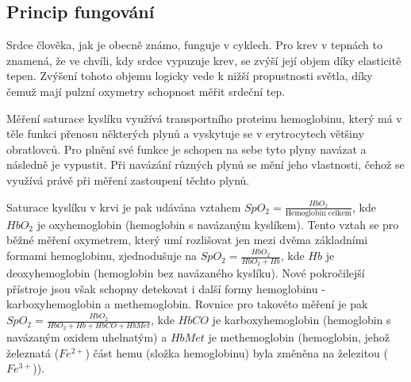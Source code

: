 \subsection {Princip fungování}
Srdce člověka, jak je obecně známo, funguje v cyklech. Pro krev v tepnách to znamená, že ve chvíli, kdy srdce vypuzuje krev, se zvýší její objem díky elasticitě tepen. Zvýšení tohoto objemu logicky vede k nižší propustnosti světla, díky čemuž mají pulzní oxymetry schopnost měřit srdeční tep.
\par Měření saturace kyslíku využívá transportního proteinu hemoglobinu, který má v těle funkci přenosu některých plynů a vyskytuje se v erytrocytech většiny obratlovců. Pro plnění své funkce je schopen na sebe tyto plyny navázat a následně je vypustit. Při navázání různých plynů se mění jeho vlastnosti, čehož se využívá právě při měření zastoupení těchto plynů.
\par Saturace kyslíku v krvi je pak udávána vztahem $SpO_2 = \frac{HbO_2}{\text{Hemoglobin celkem}}$, kde $HbO_2$ je oxyhemoglobin (hemoglobin s navázaným kyslíkem). Tento vztah se pro běžné měření oxymetrem, který umí rozlišovat jen mezi dvěma základními formami hemoglobinu, zjednodušuje na $SpO_2 = \frac{HbO_2}{HbO_2+Hb}$, kde $Hb$ je deoxyhemoglobin (hemoglobin bez navázaného kyslíku). Nové pokročilejší přístroje jsou však schopny detekovat i další formy hemoglobinu - karboxyhemoglobin a methemoglobin. Rovnice pro takovéto měření je pak $SpO_2 = \frac{HbO_2}{HbO_2+Hb+HbCO+HbMet}$, kde $HbCO$ je karboxyhemoglobin (hemoglobin s navázaným oxidem uhelnatým) a $HbMet$ je methemoglobin (hemoglobin, jehož železnatá ($Fe^{2+}$) část hemu (složka hemoglobinu) byla změněna na železitou ($Fe^{3+}$)). 
